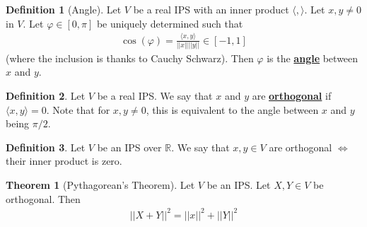 \documentclass[11pt]{scrartcl}
\newcommand{\R}[0]{\mathbb{R}}
\theoremstyle{definition}
\newtheorem{theorem}{Theorem}
\newtheorem{definition}{Definition}
\theoremstyle{remark}
\newcommand{\dfn}[1]{\textbf{\underline{#1}}}
\begin{document}
\begin{definition}[Angle]
	Let $V$ be a real IPS with an inner product $\langle, \rangle$. Let $x, y \neq 0$ in $V$. Let $\varphi \in [0, \pi]$ be uniquely determined such that
	\begin{align}
		\cos ( \varphi ) = \frac{\langle x, y \rangle}{|| x || || y ||}	 \in [-1, 1]
	\end{align}
	(where the inclusion is thanks to Cauchy Schwarz). Then $\varphi$ is the \dfn{angle} between $x$ and $y$. 
\end{definition}

\begin{definition}
	Let $V$ be a real IPS. We say that $x$ and $y$ are \dfn{orthogonal} if $\langle x, y \rangle = 0$. Note that for $x, y \neq 0$, this is equivalent to the angle between $x$ and $y$ being $\pi /2$.
\end{definition}

\begin{definition}
	Let $V$ be an IPS over $\R$. We say that $x, y \in V$ are orthogonal $\iff$ their inner product is zero. 
\end{definition}

\begin{theorem}[Pythagorean's Theorem] 
	Let $V$ be an IPS. Let $X, Y \in V$ be orthogonal. Then
	\begin{align}
		|| X + Y ||^2 = ||x||^2 + ||Y||^2	
	\end{align}
\end{theorem}
\end{document}
